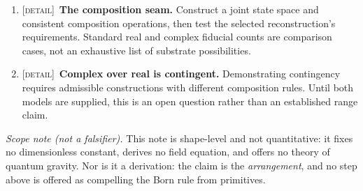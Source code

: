 \documentclass[11pt,a4paper]{article}
\theoremstyle{remark}\newtheorem{remark}[definition]{Remark}
\begin{document}
\begin{enumerate}[leftmargin=*]
chosen theorem's full hypotheses. No privileged phase and linear amplitudes
alone are insufficient. Phase-averaged additivity is a separate probability
postulate; a Gleason argument additionally requires noncontextuality.
\item \textsc{[detail]}~\textbf{The composition seam.} Construct a joint state space and
consistent composition operations, then test the selected reconstruction's
requirements. Standard real and complex fiducial counts are comparison cases,
not an exhaustive list of substrate possibilities.
\item \textsc{[detail]}~\textbf{Complex over real is contingent.} Demonstrating contingency
requires admissible constructions with different composition rules. Until
both models are supplied, this is an open question rather than an established
range claim.
\end{enumerate}

\noindent\emph{Scope note (not a falsifier).} This note is shape-level and not
quantitative: it fixes no dimensionless constant, derives no field equation, and
offers no theory of quantum gravity. Nor is it a derivation: the claim is the
\emph{arrangement}, and no step above is offered as compelling the Born rule from
primitives.
\end{document}
